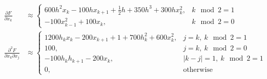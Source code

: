 \begin{align*}
    \frac{\partial F}{\partial x_k} &\approx \left \{ \begin{array}{ll}
        600h^2 x_k - 100hx_{k+1} + \frac12h + 350h^3 + 300hx_k^2, & k\mod 2 = 1\\
        -100x_{k-1}^2 + 100x_k, & k\mod 2 = 0
    \end{array} \right .\\
    \frac{\partial^2 F}{\partial x_k \partial x_j} &\approx \left \{ \begin{array}{ll}
        1200h_k x_k - 200x_{k+1} + 1 + 700h_k^2 + 600x_k^2, & j = k,\ k\mod 2 = 1\\
        100, & j = k,\ k\mod 2 = 0\\
        -100 h_k h_{k+1} - 200 x_k, & \lvert k-j \rvert = 1,\ k\mod 2 = 1\\
        0, & \text{otherwise}
    \end{array} \right .
\end{align*}

